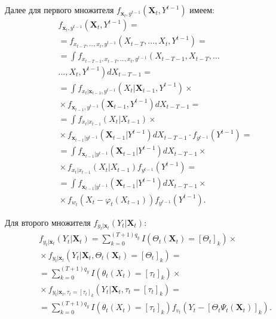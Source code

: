 \begin{multicols}{2}
\noindent
     Далее для первого множителя $f_{\mathbf{x}_t,y^{t-1}} \left( 
\mathbf{X}_t,Y^{t-1}\right)$ имеем:
     \begin{multline*}
     f_{\mathbf{x}_t,y^{t-1}} \left( \mathbf{X}_t, Y^{t-1}\right) ={}\\
     {}=
    f_{x_{t-T},\ldots , x_t, y^{t-1}} \left( X_{t-T},\ldots , X_t, Y^{t-1}\right)={}\\
     {}= \int f_{x_{t-T-1}, x_{t-T}, \ldots, x_t, y^{t-1}} \left( X_{t-T-1}, X_{t-T}, \ldots\right.\\
    \left. \ldots , X_t, Y^{t-1}\right) dX_{t-T-1}={}\\
     {}=\int f_{x_t\vert\mathbf{x}_{t-1}, y^{t-1}} \left( X_t\vert \mathbf{X}_{t-1}, Y^{t-1}\right)\times{}\\
     {}\times
     f_{\mathbf{x}_{t-1}, y^{t-1}}\left( \mathbf{X}_{t-1}, Y^{t-1}\right) dX_{t-T-1}={}\\
    {}=\int f_{x_t\vert x_{t-1}} \left( X_t\vert X_{t-1}\right)\times\\
    {}\times
     f_{\mathbf{x}_{t-1}\vert y^{t-1}}\left( \mathbf{X}_{t-1}\vert Y^{t-1}\right) dX_{t-T-1}\cdot
   f_{y^{t-1}}\left( Y^{t-1}\right)={}\\
  {}=
 \int f_{\mathbf{x}_{t-1}\vert y^{t-1}} \left( \mathbf{X}_{t-1}\vert Y^{t-1}\right) dX_{t-T-1}\times{}\\
 {}\times 
     f_{x_t\vert x_{t-1}}\left( X_t\vert X_{t-1}\right) f_{y^{t-1}} \left( Y^{t-1}\right)={}\\
     {}=
    \int f_{\mathbf{x}_{t-1}\vert y^{t-1}} \left( \mathbf{X}_{t-1}\vert Y^{t-1}\right) dX_{t-T-1}\times{}\\
    {}\times 
 f_{w_t} \left( X_t-\varphi_t\left( X_{t-1}\right)\right) f_{y^{t-1}}\left( Y^{t-1}\right).
     \end{multline*}
 
 \noindent    
     Для второго множителя $f_{y_t\vert \mathbf{x}_t} \left( Y_t\vert 
\mathbf{X}_t\right)$:
     \begin{multline*}
     f_{y_t\vert\mathbf{x}_t}\left( Y_t\vert \mathbf{X}_t\right) = 
\sum\limits_{k=0}^{(T+1) q_y} I\left( \Theta_t(\mathbf{X}_t)=[\Theta_t]_k\right) \times{}\\
{}\times
f_{y_t\vert \mathbf{x}_t} \left( Y_t\vert \mathbf{X}_t, \Theta_t(\mathbf{X}_t)=[\Theta_t]_k\right)={}\\
     {}=
     \sum\limits_{k=0}^{(T+1)q_y} I\left( \theta_t(X_t)=[\tau_t]_k\right) \times{}\\
     {}\times
f_{y_t\vert\mathbf{x}_t, \tau_t=[\tau_t]_k} \left( Y_t\vert \mathbf{X}_t, 
\tau_t=\left[\tau_t\right]_k\right)={}\\
     {}=\!\!\!\sum\limits_{k=0}^{(T+1)q_y} \!\! I\left( \theta_t(X_t) = [\tau_t]_k\right) 
f_{v_t} \left( Y_t -[\Theta_t \Psi_t(\mathbf{X}_t)]_k \right).
     \end{multline*}
     

\end{multicols}

